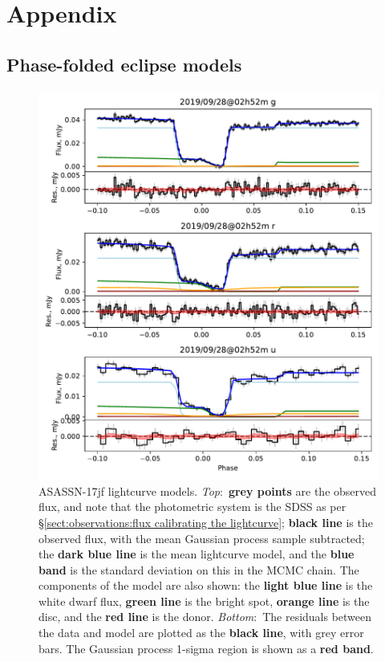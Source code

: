 
\chapter{Appendix}
\label{app:my_appendix}


\onecolumn
\section{Phase-folded eclipse models}
\label{appendix:lightcurves}

\begin{figure}
    \centering
    \includegraphics[width=\textwidth]{figures/results/three_cvs_with_weird_colours/ASASSN-17jf/ASASSN-17jf_1.pdf}
    \caption{ASASSN-17jf lightcurve models. {\it Top}:~{\bf grey points} are the observed flux, and note that the photometric system is the SDSS as per \S\ref{sect:observations:flux calibrating the lightcurve}; {\bf black line} is the observed flux, with the mean Gaussian process sample subtracted; the {\bf dark blue line} is the mean lightcurve model, and the {\bf blue band} is the standard deviation on this in the MCMC chain. The components of the model are also shown: the {\bf light blue line} is the white dwarf flux, {\bf green line} is the bright spot, {\bf orange line} is the disc, and the {\bf red line} is the donor. {\it Bottom}:~The residuals between the data and model are plotted as the {\bf black line}, with grey error bars. The Gaussian process 1-sigma region is shown as a {\bf red band}.}
    \label{fig:ASASSN-17jf all lightcurves}
\end{figure}
